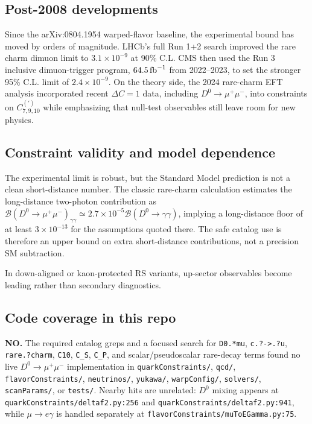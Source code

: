 \subsection*{Post-2008 developments}
Since the arXiv:0804.1954 warped-flavor baseline, the experimental bound has
moved by orders of magnitude.  LHCb's full Run 1+2 search improved the rare
charm dimuon limit to \(3.1\times10^{-9}\) at 90\% C.L.  CMS then used the
Run 3 inclusive dimuon-trigger program, \(64.5\,{\rm fb}^{-1}\) from
2022--2023, to set the stronger 95\% C.L. limit of \(2.4\times10^{-9}\).
On the theory side, the 2024 rare-charm EFT analysis incorporated recent
\(\Delta C=1\) data, including \(D^0\to\mu^+\mu^-\), into constraints on
\(C_{7,9,10}^{(\prime)}\) while emphasizing that null-test observables still
leave room for new physics.

\subsection*{Constraint validity and model dependence}
The experimental limit is robust, but the Standard Model prediction is not a
clean short-distance number.  The classic rare-charm calculation estimates the
long-distance two-photon contribution as
\(\mathcal{B}(D^0\to\mu^+\mu^-)_{\gamma\gamma}
\simeq 2.7\times10^{-5}\mathcal{B}(D^0\to\gamma\gamma)\), implying a
long-distance floor of at least \(3\times10^{-13}\) for the assumptions quoted
there.  The safe catalog use is therefore an upper bound on extra
short-distance contributions, not a precision SM subtraction.

In down-aligned or kaon-protected RS variants, up-sector observables become
leading rather than secondary diagnostics.

\subsection*{Code coverage in this repo}
\textbf{NO.}  The required catalog greps and a focused search for
\texttt{D0.*mu}, \texttt{c.?->.?u}, \texttt{rare.?charm},
\texttt{C10}, \texttt{C\_S}, \texttt{C\_P}, and scalar/pseudoscalar rare-decay
terms found no live \(D^0\to\mu^+\mu^-\) implementation in
\texttt{quarkConstraints/}, \texttt{qcd/}, \texttt{flavorConstraints/},
\texttt{neutrinos/}, \texttt{yukawa/}, \texttt{warpConfig/},
\texttt{solvers/}, \texttt{scanParams/}, or \texttt{tests/}.  Nearby hits are
unrelated: \(D^0\) mixing appears at \texttt{quarkConstraints/deltaf2.py:256}
and \texttt{quarkConstraints/deltaf2.py:941}, while
\(\mu\to e\gamma\) is handled separately at
\texttt{flavorConstraints/muToEGamma.py:75}.


